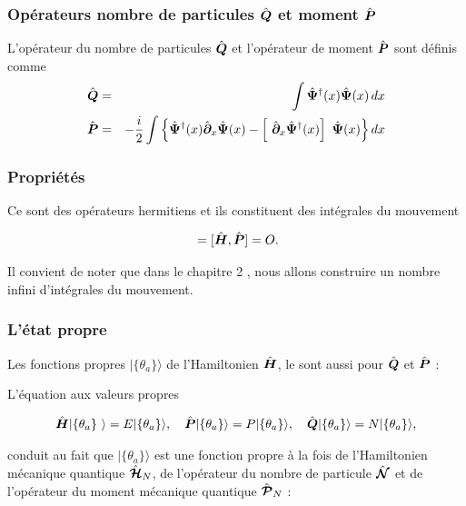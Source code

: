 \subsubsection{Opérateurs nombre de particules $\hat{\bm{Q}}$ et moment $\hat{\bm{P}}$}
L'opérateur du nombre de particules $\hat{\bm{Q}}$ et l'opérateur de moment $\hat{\bm{P}}$ sont définis comme 
\begin{eqnarray}
	\operator{Q} & = & \int \operator{\Psi}^\dag (x) \operator{\Psi} (x) \, d x \\
	\operator{P} & = & - \frac{i}2 \int \left \{  \operator{\Psi}^\dag(x) \operator{\partial}_x \operator{\Psi}(x) - \left [ \operator{\partial}_x \operator{\Psi}^\dag(x)\right ] \operator{\Psi}(x)\right \} dx \label{eq.1.7}
\end{eqnarray}

\subsubsection{Propriétés}

Ce sont des opérateurs hermitiens et ils constituent des intégrales du mouvement

\begin{eqnarray}
	[ \operator{H} , \operator{Q} ] = 	[ \operator{H} , \operator{P} ] = O. 
\end{eqnarray}

Il convient de noter que dans le chapitre 2 , nous allons construire un nombre infini d'intégrales du mouvement.

\subsubsection{L’état propre}

Les fonctions propres $\vert \{\theta_a\}\rangle$ de l'Hamiltonien $\hat{\bm{H}}$, le sont aussi pour $\hat{\bm{Q}}$ et $\hat{\bm{P}}$ :

L'équation aux valeurs propres 

\begin{eqnarray}
	\operator{H} \vert \{\theta_a\} \rangle = E \vert \{\theta_a\}\rangle, \quad \operator{P} \vert \{\theta_a\}\rangle = P \vert \{\theta_a\}\rangle, \quad \operator{Q} \vert \{\theta_a\}\rangle = N \vert \{\theta_a\}\rangle,	
\end{eqnarray}

conduit au fait que $\vert \{\theta_a\} \rangle$ est une fonction propre à la fois de l'Hamiltonien mécanique quantique $\hat{\bm{\mathcal{H}}}_N$, de l'opérateur du nombre de particule $\hat{\bm{\mathcal{N}}}$ et de l'opérateur du moment mécanique quantique $\hat{\bm{\mathcal{P}}}_N$ :

